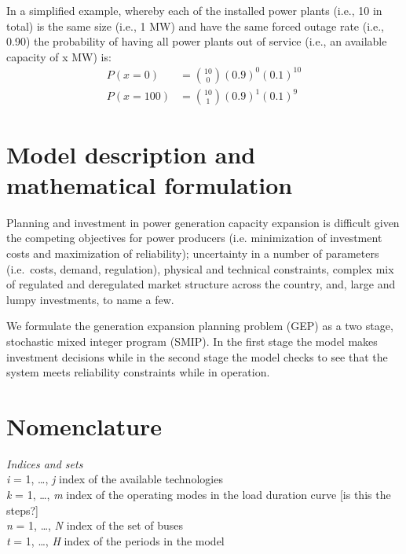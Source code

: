 \documentclass[10pt]{amsart}
\begin{document}
In a simplified example, whereby each of the installed power plants (i.e., 10 in total) is the same size (i.e., 1 MW) and have the same forced outage rate (i.e., 0.90) the probability of having all power plants out of service (i.e., an available capacity of x MW) is:
\begin{equation}
\begin{split}
P(x=0) &= \binom{10}{0}(0.9)^0(0.1)^{10} \\
P(x=100) &= \binom{10}{1}(0.9)^{1}(0.1)^{9}
\end{split}
\end{equation}

\section{Model description and mathematical formulation}
Planning and investment in power generation capacity expansion is difficult given the competing objectives for power producers (i.e. minimization of investment costs and maximization of reliability); uncertainty in a number of parameters (i.e.\ costs, demand, regulation), physical and technical constraints, complex mix of regulated and deregulated market structure across the country, and, large and lumpy investments, to name a few. 

We formulate the generation expansion planning problem (GEP) as a two stage, stochastic mixed integer program (SMIP). 
In the first stage the model makes investment decisions while in the second stage the model checks to see that the system meets reliability constraints while in operation.

\section{Nomenclature}
\begin{flushleft}
\textit{Indices and sets}\\
\textit{i} = 1, \ldots, \textit{j} index of the available technologies \\ 
\textit{k} = 1, \ldots, \textit{m} index of the operating modes in the load duration curve [is this the steps?] \\
\textit{n} = 1, \ldots, \textit{N} index of the set of buses \\
\textit{t} = 1, \ldots, \textit{H} index of the periods in the model \\
\end{flushleft}
\end{document}
